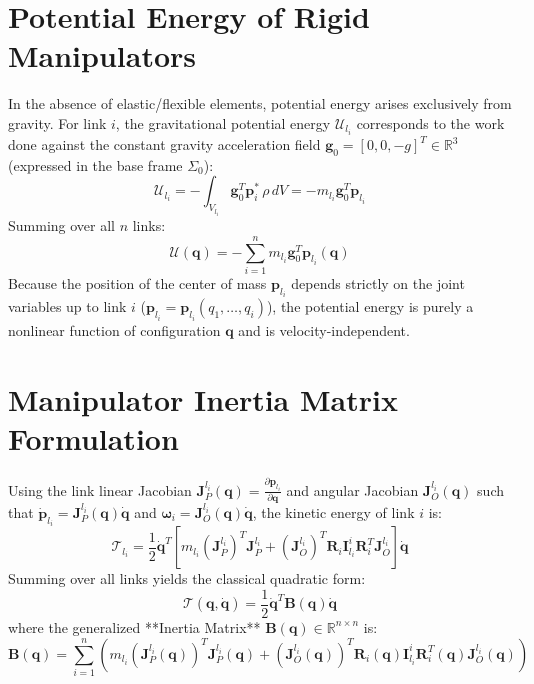 \documentclass[11pt, a4paper]{article}
\begin{document}
\section{Potential Energy of Rigid Manipulators}
In the absence of elastic/flexible elements, potential energy arises exclusively from gravity. For link $i$, the gravitational potential energy $\mathcal{U}_{l_i}$ corresponds to the work done against the constant gravity acceleration field $\mathbf{g}_0 = [0, 0, -g]^T \in \mathbb{R}^3$ (expressed in the base frame $\Sigma_0$):
\begin{equation}
    \mathcal{U}_{l_i} = -\int_{V_{l_i}} \mathbf{g}_0^T \mathbf{p}_i^* \, \rho \, dV = -m_{l_i} \mathbf{g}_0^T \mathbf{p}_{l_i}
\end{equation}
Summing over all $n$ links:
\begin{equation}
    \mathcal{U}(\mathbf{q}) = -\sum_{i=1}^n m_{l_i} \mathbf{g}_0^T \mathbf{p}_{l_i}(\mathbf{q})
\end{equation}
Because the position of the center of mass $\mathbf{p}_{l_i}$ depends strictly on the joint variables up to link $i$ ($\mathbf{p}_{l_i} = \mathbf{p}_{l_i}(q_1, \dots, q_i)$), the potential energy is purely a nonlinear function of configuration $\mathbf{q}$ and is velocity-independent.

\section{Manipulator Inertia Matrix Formulation}
Using the link linear Jacobian $\mathbf{J}_P^{l_i}(\mathbf{q}) = \frac{\partial \mathbf{p}_{l_i}}{\partial \mathbf{q}}$ and angular Jacobian $\mathbf{J}_O^{l_i}(\mathbf{q})$ such that $\mathbf{\dot{p}}_{l_i} = \mathbf{J}_P^{l_i}(\mathbf{q})\mathbf{\dot{q}}$ and $\boldsymbol{\omega}_i = \mathbf{J}_O^{l_i}(\mathbf{q})\mathbf{\dot{q}}$, the kinetic energy of link $i$ is:
\begin{equation}
    \mathcal{T}_{l_i} = \frac{1}{2} \mathbf{\dot{q}}^T \left[ m_{l_i} (\mathbf{J}_P^{l_i})^T \mathbf{J}_P^{l_i} + (\mathbf{J}_O^{l_i})^T \mathbf{R}_i \mathbf{I}_{l_i}^i \mathbf{R}_i^T \mathbf{J}_O^{l_i} \right] \mathbf{\dot{q}}
\end{equation}
Summing over all links yields the classical quadratic form:
\begin{equation}
    \mathcal{T}(\mathbf{q}, \mathbf{\dot{q}}) = \frac{1}{2} \mathbf{\dot{q}}^T \mathbf{B}(\mathbf{q}) \mathbf{\dot{q}}
\end{equation}
where the generalized **Inertia Matrix** $\mathbf{B}(\mathbf{q}) \in \mathbb{R}^{n \times n}$ is:
\begin{equation}
    \mathbf{B}(\mathbf{q}) = \sum_{i=1}^n \left( m_{l_i} (\mathbf{J}_P^{l_i}(\mathbf{q}))^T \mathbf{J}_P^{l_i}(\mathbf{q}) + (\mathbf{J}_O^{l_i}(\mathbf{q}))^T \mathbf{R}_i(\mathbf{q}) \mathbf{I}_{l_i}^i \mathbf{R}_i^T(\mathbf{q}) \mathbf{J}_O^{l_i}(\mathbf{q}) \right)
\end{equation}
\end{document}
